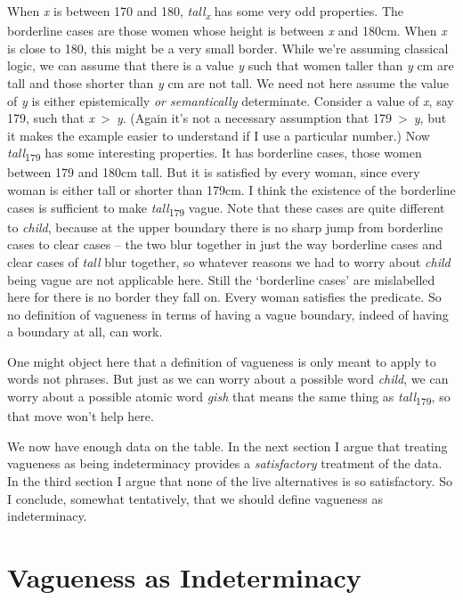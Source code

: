 \documentclass[
  10pt,
  letterpaper,
  DIV=11,
  numbers=noendperiod,
  twoside]{scrartcl}
\begin{document}
When \emph{x} is between 170 and 180, \emph{tall\textsubscript{x}} has
some very odd properties. The borderline cases are those women whose
height is between \emph{x} and 180cm. When \emph{x} is close to 180,
this might be a very small border. While we're assuming classical logic,
we can assume that there is a value \emph{y} such that women taller than
\emph{y} cm are tall and those shorter than \emph{y} cm are not tall. We
need not here assume the value of \emph{y} is either epistemically
\emph{or semantically} determinate. Consider a value of \emph{x}, say
179, such that \emph{x}~\textgreater~\emph{y}. (Again it's not a
necessary assumption that 179~\textgreater~\emph{y}, but it makes the
example easier to understand if I use a particular number.) Now
\emph{tall}\textsubscript{179} has some interesting properties. It has
borderline cases, those women between 179 and 180cm tall. But it is
satisfied by every woman, since every woman is either tall or shorter
than 179cm. I think the existence of the borderline cases is sufficient
to make \emph{tall}\textsubscript{179} vague. Note that these cases are
quite different to \emph{child}, because at the upper boundary there is
no sharp jump from borderline cases to clear cases -- the two blur
together in just the way borderline cases and clear cases of \emph{tall}
blur together, so whatever reasons we had to worry about \emph{child}
being vague are not applicable here. Still the `borderline cases' are
mislabelled here for there is no border they fall on. Every woman
satisfies the predicate. So no definition of vagueness in terms of
having a vague boundary, indeed of having a boundary at all, can work.

One might object here that a definition of vagueness is only meant to
apply to words not phrases. But just as we can worry about a possible
word \emph{child}, we can worry about a possible atomic word \emph{gish}
that means the same thing as \emph{tall}\textsubscript{179}, so that
move won't help here.

We now have enough data on the table. In the next section I argue that
treating vagueness as being indeterminacy provides a \emph{satisfactory}
treatment of the data. In the third section I argue that none of the
live alternatives is so satisfactory. So I conclude, somewhat
tentatively, that we should define vagueness as indeterminacy.

\section{Vagueness as Indeterminacy}\label{vagueness-as-indeterminacy}
\end{document}
